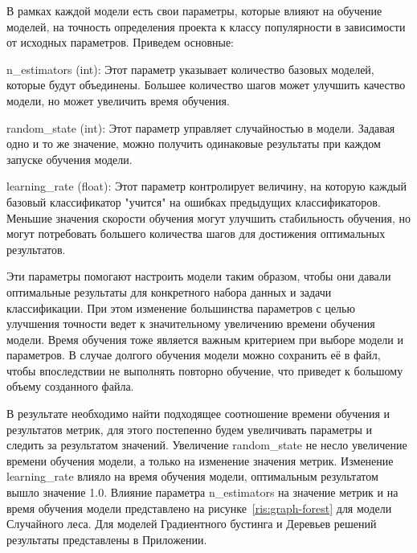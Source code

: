 В рамках каждой модели есть свои параметры, которые влияют на обучение моделей, на точность определения проекта к классу популярности в зависимости от исходных параметров. Приведем основные:

\begin{itemizecustom}
    \item n\_estimators (int): Этот параметр указывает количество базовых моделей, которые будут объединены. Большее количество шагов может улучшить качество модели, но может увеличить время обучения.
    
    \item random\_state (int): Этот параметр управляет случайностью в модели. Задавая одно и то же значение, можно получить одинаковые результаты при каждом запуске обучения модели.

    \item learning\_rate (float): Этот параметр контролирует величину, на которую каждый базовый классификатор "учится" на ошибках предыдущих классификаторов. Меньшие значения скорости обучения могут улучшить стабильность обучения, но могут потребовать большего количества шагов для достижения оптимальных результатов.
\end{itemizecustom}

Эти параметры помогают настроить модели таким образом, чтобы они давали оптимальные результаты для конкретного набора данных и задачи классификации. При этом изменение большинства параметров с целью улучшения точности ведет к значительному увеличению времени обучения модели. Время обучения тоже является важным критерием при выборе модели и параметров. В случае долгого обучения модели можно сохранить её в файл, чтобы впоследствии не выполнять повторно обучение, что приведет к большому объему созданного файла. 

В результате необходимо найти подходящее соотношение времени обучения и результатов метрик, для этого постепенно будем увеличивать параметры и следить за результатом значений. Увеличение random\_state не несло увеличение времени обучения модели, а только на изменение значения метрик. Изменение learning\_rate влияло на время обучения модели, оптимальным результатом вышло значение 1.0. Влияние параметра n\_estimators на значение метрик и на время обучения модели представлено на рисунке~\ref{ris:graph-forest} для модели Случайного леса. Для моделей Градиентного бустинга и Деревьев решений результаты представлены в Приложении.
\fxnote{}

